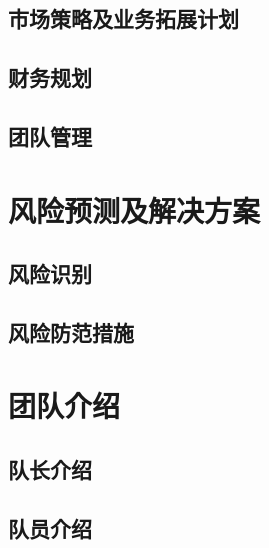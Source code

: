 \documentclass[a4paper]{ctexart}
\begin{document}
\subsection{市场策略及业务拓展计划}

\subsection{财务规划}

\subsection{团队管理}

\section{风险预测及解决方案}

\subsection{风险识别}

\subsection{风险防范措施}

\section{团队介绍}

\subsection{队长介绍}

\subsection{队员介绍}
\end{document}
